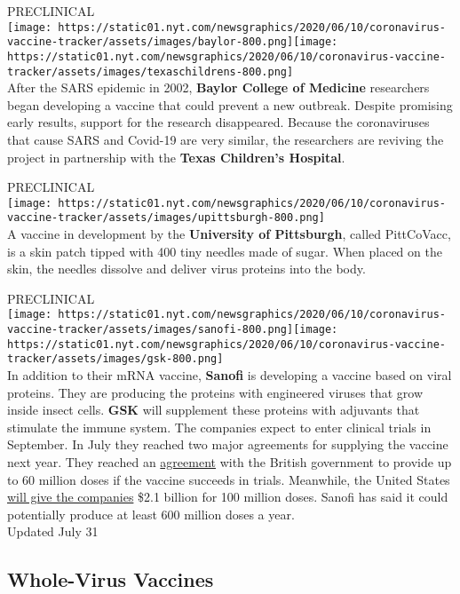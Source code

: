 PRECLINICAL\\
\texttt{[image: https://static01.nyt.com/newsgraphics/2020/06/10/coronavirus-vaccine-tracker/assets/images/baylor-800.png]}\texttt{[image: https://static01.nyt.com/newsgraphics/2020/06/10/coronavirus-vaccine-tracker/assets/images/texaschildrens-800.png]}\\
After the SARS epidemic in 2002, \textbf{Baylor College of Medicine}
researchers began developing a vaccine that could prevent a new
outbreak. Despite promising early results, support for the research
disappeared. Because the coronaviruses that cause SARS and Covid-19 are
very similar, the researchers are reviving the project in partnership
with the \textbf{Texas Children's Hospital}.

PRECLINICAL\\
\texttt{[image: https://static01.nyt.com/newsgraphics/2020/06/10/coronavirus-vaccine-tracker/assets/images/upittsburgh-800.png]}\\
A vaccine in development by the \textbf{University of Pittsburgh},
called PittCoVacc, is a skin patch tipped with 400 tiny needles made of
sugar. When placed on the skin, the needles dissolve and deliver virus
proteins into the body.

PRECLINICAL\\
\texttt{[image: https://static01.nyt.com/newsgraphics/2020/06/10/coronavirus-vaccine-tracker/assets/images/sanofi-800.png]}\texttt{[image: https://static01.nyt.com/newsgraphics/2020/06/10/coronavirus-vaccine-tracker/assets/images/gsk-800.png]}\\
In addition to their mRNA vaccine, \textbf{Sanofi} is developing a
vaccine based on viral proteins. They are producing the proteins with
engineered viruses that grow inside insect cells. \textbf{GSK} will
supplement these proteins with adjuvants that stimulate the immune
system. The companies expect to enter clinical trials in September. In
July they reached two major agreements for supplying the vaccine next
year. They reached an
\href{https://www.sanofi.com/en/media-room/press-releases/2020/2020-07-29-07-00-00}{agreement}
with the British government to provide up to 60 million doses if the
vaccine succeeds in trials. Meanwhile, the United States
\href{https://www.nytimes.com/2020/07/31/health/covid-19-vaccine-sanofi-gsk.html}{will
give the companies} \$2.1 billion for 100 million doses. Sanofi has said
it could potentially produce at least 600 million doses a year.\\
Updated July 31

\hypertarget{whole-virus-vaccines}{%
\subsection{\texorpdfstring{\textbf{Whole-Virus
Vaccines}}{Whole-Virus Vaccines}}\label{whole-virus-vaccines}}

